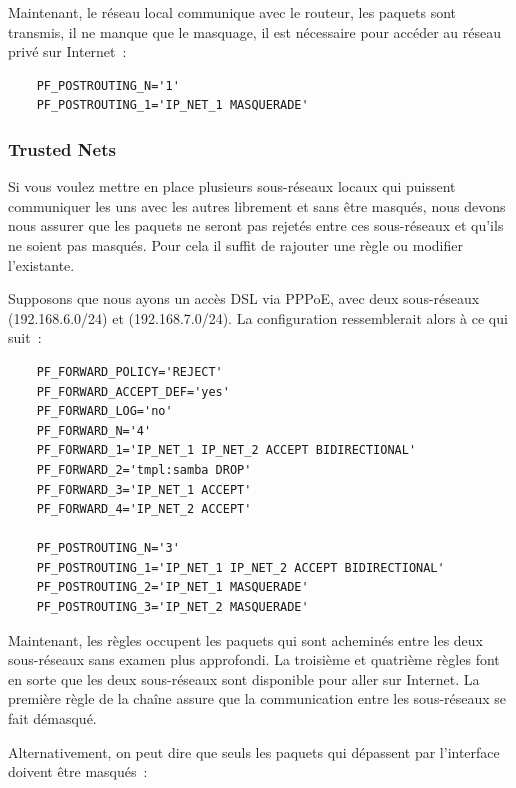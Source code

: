 Maintenant, le réseau local communique avec le routeur, les paquets sont
transmis, il ne manque que le masquage, il est nécessaire pour accéder au
réseau privé sur Internet~:

\begin{example}
\begin{verbatim}
    PF_POSTROUTING_N='1'
    PF_POSTROUTING_1='IP_NET_1 MASQUERADE'
\end{verbatim}
\end{example}

\subsubsection{Trusted Nets}

Si vous voulez mettre en place plusieurs sous-réseaux locaux qui puissent
communiquer les uns avec les autres librement et sans être masqués, nous devons
nous assurer que les paquets ne seront pas rejetés entre ces sous-réseaux et
qu'ils ne soient pas masqués. Pour cela il suffit de rajouter une règle ou
modifier l'existante.

Supposons que nous ayons un accès DSL via PPPoE, avec deux sous-réseaux
 (192.168.6.0/24) et  (192.168.7.0/24).
La configuration ressemblerait alors à ce qui suit~:

\begin{example}
\begin{verbatim}
    PF_FORWARD_POLICY='REJECT'
    PF_FORWARD_ACCEPT_DEF='yes'
    PF_FORWARD_LOG='no'
    PF_FORWARD_N='4'
    PF_FORWARD_1='IP_NET_1 IP_NET_2 ACCEPT BIDIRECTIONAL'
    PF_FORWARD_2='tmpl:samba DROP'
    PF_FORWARD_3='IP_NET_1 ACCEPT'
    PF_FORWARD_4='IP_NET_2 ACCEPT'

    PF_POSTROUTING_N='3'
    PF_POSTROUTING_1='IP_NET_1 IP_NET_2 ACCEPT BIDIRECTIONAL'
    PF_POSTROUTING_2='IP_NET_1 MASQUERADE'
    PF_POSTROUTING_3='IP_NET_2 MASQUERADE'
\end{verbatim}
\end{example}

Maintenant, les règles occupent les paquets qui sont acheminés entre les deux
sous-réseaux sans examen plus approfondi. La troisième et quatrième règles
font en sorte que les deux sous-réseaux sont disponible pour aller sur
Internet. La première règle de la chaîne  assure que
la communication entre les sous-réseaux se fait démasqué.

Alternativement, on peut dire que seuls les paquets qui dépassent par
l'interface  doivent être masqués~:

